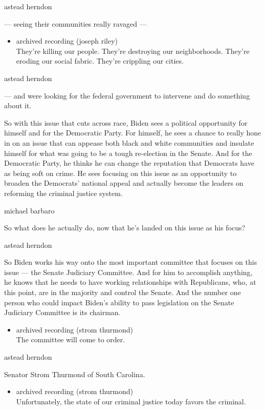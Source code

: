 astead herndon

--- seeing their communities really ravaged ---

\begin{itemize}
\tightlist
\item
  archived recording (joseph riley)\\
  They're killing our people. They're destroying our neighborhoods.
  They're eroding our social fabric. They're crippling our cities.
\end{itemize}

astead herndon

--- and were looking for the federal government to intervene and do
something about it.

So with this issue that cuts across race, Biden sees a political
opportunity for himself and for the Democratic Party. For himself, he
sees a chance to really hone in on an issue that can appease both black
and white communities and insulate himself for what was going to be a
tough re-election in the Senate. And for the Democratic Party, he thinks
he can change the reputation that Democrats have as being soft on crime.
He sees focusing on this issue as an opportunity to broaden the
Democrats' national appeal and actually become the leaders on reforming
the criminal justice system.

michael barbaro

So what does he actually do, now that he's landed on this issue as his
focus?

astead herndon

So Biden works his way onto the most important committee that focuses on
this issue --- the Senate Judiciary Committee. And for him to accomplish
anything, he knows that he needs to have working relationships with
Republicans, who, at this point, are in the majority and control the
Senate. And the number one person who could impact Biden's ability to
pass legislation on the Senate Judiciary Committee is its chairman.

\begin{itemize}
\tightlist
\item
  archived recording (strom thurmond)\\
  The committee will come to order.
\end{itemize}

astead herndon

Senator Strom Thurmond of South Carolina.

\begin{itemize}
\tightlist
\item
  archived recording (strom thurmond)\\
  Unfortunately, the state of our criminal justice today favors the
  criminal.
\end{itemize}

